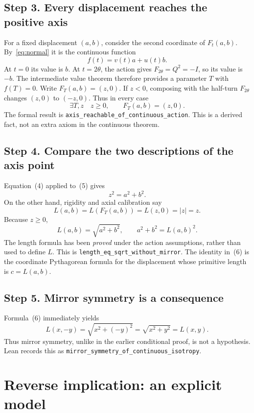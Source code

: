 \documentclass[11pt,a4paper]{article}
\begin{document}
\subsection*{Step 3. Every displacement reaches the positive axis}

For a fixed displacement $(a,b)$, consider the second coordinate
of $F_t(a,b)$. By~\eqref{eq:normal} it is the continuous function
\[
 f(t)=v(t)a+u(t)b.
\]
At $t=0$ its value is $b$. At $t=2\theta$,
the action gives $F_{2\theta}=Q^2=-I$, so its
value is $-b$. The intermediate value theorem therefore
provides a parameter $T$ with $f(T)=0$.
Write $F_T(a,b)=(z,0)$. If $z<0$, composing with
the half-turn $F_{2\theta}$ changes $(z,0)$
to $(-z,0)$. Thus in every case
\[
 \exists T,z\quad z\ge0,\qquad F_T(a,b)=(z,0).
 \tag{5}
\]
The formal result is
\texttt{axis\_reachable\_of\_continuous\_action}.
This is a derived fact, not an extra axiom in the
continuous theorem.

\subsection*{Step 4. Compare the two descriptions of the axis point}

Equation~(4) applied to~(5) gives
\[
 z^2=a^2+b^2.
\]
On the other hand, rigidity and axial calibration say
\[
 L(a,b)=L(F_T(a,b))=L(z,0)=|z|=z.
\]
Because $z\ge0$,
\[
 \boxed{L(a,b)=\sqrt{a^2+b^2}},\qquad
 \boxed{a^2+b^2=L(a,b)^2}. \tag{6}
\]
The length formula has been \emph{proved} under the
action assumptions, rather than used to define $L$.
This is \texttt{length\_eq\_sqrt\_without\_mirror}.
The identity in~(6) is the coordinate
Pythagorean formula for the displacement whose primitive
length is $c=L(a,b)$.

\subsection*{Step 5. Mirror symmetry is a consequence}

Formula~(6) immediately yields
\[
 L(x,-y)=\sqrt{x^2+(-y)^2}
        =\sqrt{x^2+y^2}=L(x,y).
\]
Thus mirror symmetry, unlike in the earlier conditional proof,
is not a hypothesis. Lean records this as
\texttt{mirror\_symmetry\_of\_continuous\_isotropy}.

\section{Reverse implication: an explicit model}
\end{document}
